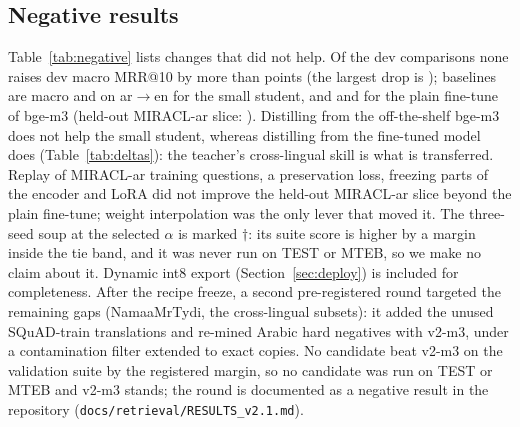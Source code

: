 \documentclass[11pt]{article}
\newcommand{\tabfont}{\footnotesize\setlength{\tabcolsep}{3.2pt}}
\newcommand{\ardir}{ar$\to$en}
\begin{document}
\subsection{Negative results}
Table~\ref{tab:negative} lists changes that did not help.
Of the \NumNegRows{} dev comparisons none raises dev macro MRR@10 by more than \NumNegMaxGainMacro{} points (the largest drop is \NumNegMinMacro{}); baselines are \NumNegBaseSmallMacro{} macro and \NumNegBaseSmallArEn{} on \ardir{} for the small student, and \NumNegBaseBgeMacro{} and \NumNegBaseBgeArEn{} for the plain fine-tune of bge-m3 (held-out MIRACL-ar slice: \NumNegBaseBgeDevM).
Distilling from the off-the-shelf bge-m3 does not help the small student, whereas distilling from the fine-tuned model does (Table~\ref{tab:deltas}): the teacher's cross-lingual skill is what is transferred.
Replay of MIRACL-ar training questions, a preservation loss, freezing parts of the encoder and LoRA did not improve the held-out MIRACL-ar slice beyond the plain fine-tune; weight interpolation was the only lever that moved it.
The three-seed soup at the selected $\alpha$ is marked $\dagger$: its suite score is higher by a margin inside the tie band, and it was never run on TEST or MTEB, so we make no claim about it.
Dynamic int8 export (Section~\ref{sec:deploy}) is included for completeness.
After the recipe freeze, a second pre-registered round targeted the remaining gaps (NamaaMrTydi, the cross-lingual subsets): it added the unused SQuAD-train translations and re-mined Arabic hard negatives with v2-m3, under a contamination filter extended to exact copies. No candidate beat v2-m3 on the validation suite by the registered margin, so no candidate was run on TEST or MTEB and v2-m3 stands; the round is documented as a negative result in the repository (\texttt{docs/retrieval/RESULTS\_v2.1.md}).

\begin{table}[t]
\centering\tabfont
{}
\caption{Negative and null results, effect on dev versus the baseline of the same group (small student: no change; bge-m3: plain fine-tune; soup: the single seed); the last column says whether the change is in the final recipe. $\Delta$ MIRACL-ar: held-out slice of MIRACL-ar training questions, selection only. $\dagger$ within the selection rule's tie band; never run on TEST or MTEB.}\label{tab:negative}
\end{table}

\begin{table}[t]
\centering\tabfont
{}
\caption{DEV MRR@10 $\times100$ for the distillation variants and the WiSE blends; the last column is the held-out MIRACL-ar slice.}\label{tab:ablation}
\end{table}
\end{document}
